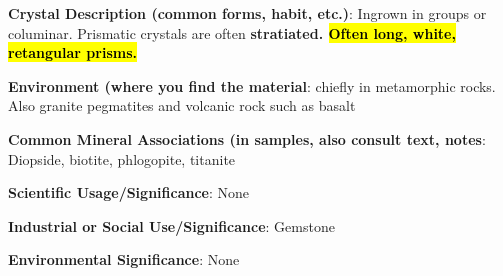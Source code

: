 \documentclass[10pt]{article}
\begin{document}
\begin{framed}
  \textbf{Crystal Description (common forms, habit, etc.)}: Ingrown in groups or columinar. Prismatic crystals are often \bf{stratiated}. \hl{Often long, white, retangular prisms.}
\end{framed}

\begin{framed}
  \textbf{Environment (where you find the material}: chiefly in metamorphic rocks. Also granite pegmatites and volcanic rock such as basalt
\end{framed}

\begin{framed}
  \textbf{Common Mineral Associations (in samples, also consult text, notes}: Diopside, biotite, phlogopite, titanite
\end{framed}

\begin{framed}
  \textbf{Scientific Usage/Significance}: None
\end{framed}

\begin{framed}
  \textbf{Industrial or Social Use/Significance}: Gemstone
\end{framed}

\begin{framed}
  \textbf{Environmental Significance}: None
\end{framed}

\end{document}
